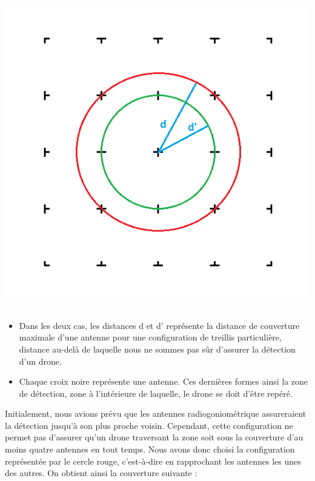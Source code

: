 \begin{minipage}{0.45\linewidth}

  \centering
  \includegraphics[width=\textwidth]{treillis_explication}
  ~\\
\end{minipage}
\begin{minipage}{0.45\linewidth}
  \begin{itemize}
  \item Dans les deux cas, les distances d et d’ représente la distance de couverture maximale d’une antenne pour une configuration de treillis particulière, distance au-delà de laquelle nous ne sommes pas sûr d’assurer la détection d’un drone.
  \item Chaque croix noire représente une antenne. Ces dernières formes ainsi la zone de détection, zone à l’intérieure de laquelle, le drone se doit d’être repéré.
  \end{itemize}
\end{minipage}


Initialement, nous avions prévu que les antennes radiogoniométrique assureraient la détection
jusqu’à son plus proche voisin. Cependant, cette configuration ne permet pas d’assurer qu’un drone
traversant la zone soit sous la couverture d’au moins quatre antennes en tout temps. Nous avons
donc choisi la configuration représentée par le cercle rouge, c’est-à-dire en rapprochant les antennes
les unes des autres. On obtient ainsi la couverture suivante :
~\\


